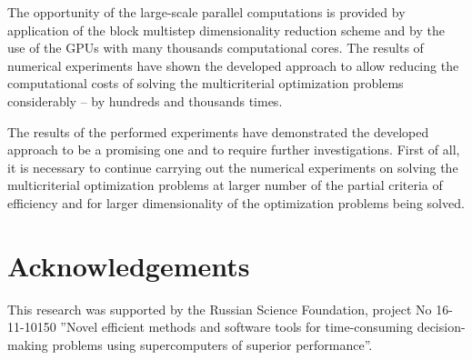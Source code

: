 \documentclass[runningheads]{llncs}
\begin{document}
The opportunity of the large-scale parallel computations is provided by application of the block multistep dimensionality reduction scheme and by the use of the GPUs with many thousands computational cores. The results of numerical experiments have shown the developed approach to allow reducing the computational costs of solving the multicriterial optimization problems considerably -- by hundreds and thousands times.

The results of the performed experiments have demonstrated the developed approach to be a promising one and to require further investigations. First of all, it is necessary to continue carrying out the numerical experiments on solving the multicriterial optimization problems at larger number of the partial criteria of efficiency and for larger dimensionality of the optimization problems being solved. 

          
\section*{Acknowledgements}
This research was supported by the Russian Science Foundation, project No 16-11-10150 ''Novel efficient methods and software tools for time-consuming decision-making problems using supercomputers of superior performance''.
\end{document}
